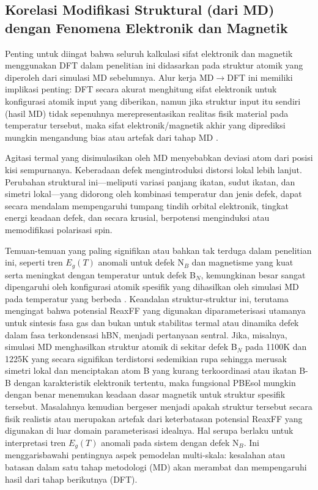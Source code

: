 \subsection{Korelasi Modifikasi Struktural (dari MD) dengan Fenomena Elektronik dan Magnetik}
\label{subsec:korelasi_struktur_md_dft}
Penting untuk diingat bahwa seluruh kalkulasi sifat elektronik dan magnetik menggunakan DFT dalam penelitian ini didasarkan pada struktur atomik yang diperoleh dari simulasi MD sebelumnya. Alur kerja MD$\rightarrow$DFT ini memiliki implikasi penting: DFT secara akurat menghitung sifat elektronik untuk konfigurasi atomik input yang diberikan, namun jika struktur input itu sendiri (hasil MD) tidak sepenuhnya merepresentasikan realitas fisik material pada temperatur tersebut, maka sifat elektronik/magnetik akhir yang diprediksi mungkin mengandung bias atau artefak dari tahap MD \cite{[1]}.

Agitasi termal yang disimulasikan oleh MD menyebabkan deviasi atom dari posisi kisi sempurnanya. Keberadaan defek mengintroduksi distorsi lokal lebih lanjut. Perubahan struktural ini—meliputi variasi panjang ikatan, sudut ikatan, dan simetri lokal—yang didorong oleh kombinasi temperatur dan jenis defek, dapat secara mendalam mempengaruhi tumpang tindih orbital elektronik, tingkat energi keadaan defek, dan secara krusial, berpotensi menginduksi atau memodifikasi polarisasi spin.

Temuan-temuan yang paling signifikan atau bahkan tak terduga dalam penelitian ini, seperti tren $E_g(T)$ anomali untuk defek N$_B$ dan magnetisme yang kuat serta meningkat dengan temperatur untuk defek B$_N$, kemungkinan besar sangat dipengaruhi oleh konfigurasi atomik spesifik yang dihasilkan oleh simulasi MD pada temperatur yang berbeda \cite{[1]}. Keandalan struktur-struktur ini, terutama mengingat bahwa potensial ReaxFF yang digunakan \cite{Ostadhossein2022} diparameterisasi utamanya untuk sintesis fasa gas dan bukan untuk stabilitas termal atau dinamika defek dalam fasa terkondensasi hBN, menjadi pertanyaan sentral. Jika, misalnya, simulasi MD menghasilkan struktur atomik di sekitar defek B$_N$ pada 1100K dan 1225K yang secara signifikan terdistorsi sedemikian rupa sehingga merusak simetri lokal dan menciptakan atom B yang kurang terkoordinasi atau ikatan B-B dengan karakteristik elektronik tertentu, maka fungsional PBEsol mungkin dengan benar menemukan keadaan dasar magnetik untuk struktur spesifik tersebut. Masalahnya kemudian bergeser menjadi apakah struktur tersebut secara fisik realistis atau merupakan artefak dari keterbatasan potensial ReaxFF yang digunakan di luar domain parameterisasi idealnya. Hal serupa berlaku untuk interpretasi tren $E_g(T)$ anomali pada sistem dengan defek N$_B$. Ini menggarisbawahi pentingnya aspek pemodelan multi-skala: kesalahan atau batasan dalam satu tahap metodologi (MD) akan merambat dan mempengaruhi hasil dari tahap berikutnya (DFT).

